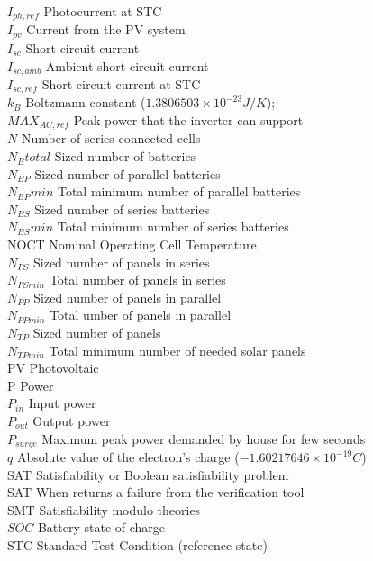 $ I_{ph,ref} $ Photocurrent at STC \\
$I_{pv}$ Current from the PV system \\
$ I_{sc} $ Short-circuit current \\
$ I_{sc,amb} $ Ambient short-circuit current \\
$ I_{sc,ref} $ Short-circuit current at STC \\
$ k_{B} $ Boltzmann constant ($ 1.3806503\times10^{-23}J/K $); \\
$MAX_{AC,ref}$ Peak power that the inverter can support \\
$N$ Number of series-connected cells \\
$N_{B}total$ Sized number of batteries \\
$N_{BP}$ Sized number of parallel batteries \\
$N_{BP}min$ Total minimum number of parallel batteries \\
$N_{BS}$ Sized number of series batteries \\
$N_{BS}min$ Total minimum number of series batteries \\
NOCT Nominal Operating Cell Temperature \\
$N_{PS}$ Sized number of panels in series \\
$N_{PSmin}$ Total number of panels in series \\
$N_{PP}$ Sized number of panels in parallel \\
$N_{PPmin}$ Total umber of panels in parallel \\
$ N_{TP} $ Sized number of panels \\
$N_{TPmin}$ Total minimum number of needed solar panels \\
PV Photovoltaic \\
P Power \\
$P_{in}$ Input power \\
$P_{out}$ Output power \\
$P_{surge}$ Maximum peak power demanded by house for few seconds \\
$q$ Absolute value of the electron's charge ($ -1.60217646\times10^{-19}C $) \\
SAT Satisfiability or Boolean satisfiability problem \\
SAT When returns a failure from the verification tool \\
SMT Satisfiability modulo theories \\
$ SOC $ Battery state of charge \\
STC Standard Test Condition (reference state) \\
